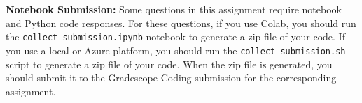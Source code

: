 {\bf Notebook Submission:}
Some questions in this assignment require notebook and Python code responses. For these questions, if you use Colab, you should run the \texttt{collect\_submission.ipynb} notebook to generate a zip file of your code. If you use a local or Azure platform, you should run the \texttt{collect\_submission.sh} script to generate a zip file of your code. When the zip file is generated, you should submit it to the Gradescope Coding submission for the corresponding assignment.